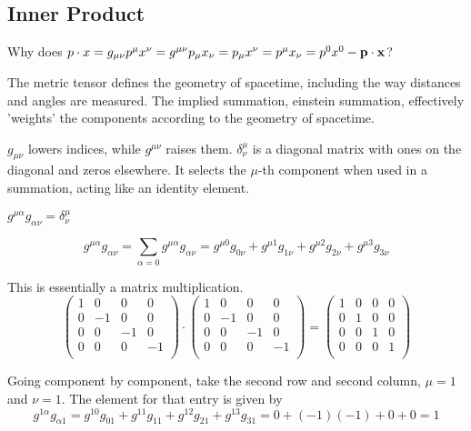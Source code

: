 \subsection{Inner Product}

Why does $p \cdot x = g_{\mu\nu} p^\mu x^\nu = g^{\mu\nu} p_\mu x_\nu = p_\mu x^\nu = p^\mu x_\nu = p^0 x^0 - \boldsymbol{\mathbf{p}}\cdot\boldsymbol{\mathbf{x}}$?

The metric tensor defines the geometry of spacetime, including the way distances and angles are measured.
The implied summation, einstein summation, effectively 'weights' the components according to the geometry of spacetime.

$g_{\mu\nu}$ lowers indices, while $g^{\mu\nu}$ raises them.
$\delta^{\mu}_{\nu}$ is a diagonal matrix with ones on the diagonal and zeros elsewhere.
It selects the $\mu$-th component when used in a summation, acting like an identity element.

$g^{\mu\alpha} g_{\alpha\nu} = \delta^{\mu}_{\nu}$

$$
g^{\mu\alpha} g_{\alpha\nu} = \sum_{\alpha = 0} g^{\mu\alpha} g_{\alpha\nu} =
g^{\mu 0} g_{0 \nu} + g^{\mu 1} g_{1\nu} + g^{\mu 2} g_{2\nu} + g^{\mu 3} g_{3\nu}
$$

This is essentially a matrix multiplication.
$$
\begin{pmatrix}
    1 & 0  & 0  & 0  \\
    0 & -1 & 0  & 0  \\
    0 & 0  & -1 & 0  \\
    0 & 0  & 0  & -1 \\
\end{pmatrix}
\cdot
\begin{pmatrix}
    1 & 0  & 0  & 0  \\
    0 & -1 & 0  & 0  \\
    0 & 0  & -1 & 0  \\
    0 & 0  & 0  & -1 \\
\end{pmatrix}
=
\begin{pmatrix}
    1 & 0 & 0 & 0 \\
    0 & 1 & 0 & 0 \\
    0 & 0 & 1 & 0 \\
    0 & 0 & 0 & 1 \\
\end{pmatrix}
$$

Going component by component, take the second row and second column, $\mu=1$ and $\nu=1$.
The element for that entry is given by
$$
g^{1\alpha}g_{\alpha 1} =
g^{1 0} g_{0 1} + g^{1 1} g_{1 1} + g^{1 2} g_{2 1} + g^{1 3} g_{3 1}
= 0 + (-1)(-1) + 0 + 0 = 1
$$